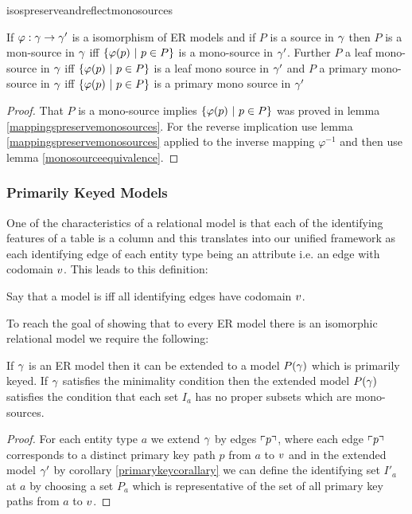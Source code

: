 isospreserveandreflectmonosources
\begin{lemma}
\label{isospreserveandreflectmonosources}
If $\varphi: \gamma \rightarrow \gamma'$ is a isomorphism of ER models and
if $P$ is a source in $\gamma$ then 
$P$ is a mon-source in $\gamma$
iff 
$\left\{\varphi(p) \ \middle|\ p\in P\right\}$ is a mono-source in $\gamma'$. 
Further  $P$ a leaf mono-source in $\gamma$ iff $\left\{\varphi(p) \ \middle|\ p\in P\right\}$ is a leaf mono source in $\gamma'$ and $P$ a primary mono-source in $\gamma$ iff $\left\{\varphi(p) \ \middle|\ p\in P\right\}$ is a primary mono source in $\gamma'$
\end{lemma}
\begin{proof}
That $P$ is a mono-source implies $\left\{\varphi(p) \ \middle|\ p\in P\right\}$ was proved
in lemma \ref{mappingspreservemonosources}. For the reverse implication use 
lemma \ref{mappingspreservemonosources} applied to the inverse mapping $\varphi^{-1}$
and then use lemma \ref{monosourceequivalence}.
\end{proof}


\subsubsection{Primarily Keyed Models}

One of the characteristics of a relational model is that each of the identifying features of a table is a column
and this translates into our unified framework as each identifying edge of each entity type being an attribute i.e. 
an edge with codomain $v$. This leads to this definition: 
\begin{definition}
Say that a model is  iff all identifying edges 
have codomain $v$.
\end{definition}
To reach the goal of showing that to every ER model there is an isomorphic relational model we require the following:
\begin{lemma}
If $\gamma$ is an ER model then it can be extended to a model $P(\gamma)$
which is primarily keyed. If $\gamma$ satisfies the minimality condition then the
extended model $P(\gamma)$ satisfies the  condition that each set $I_a$ has no proper subsets which are mono-sources. 
\end{lemma}
\begin{proof}
For each entity type $a$ we extend $\gamma$ by edges $\left\ulcorner p\right\urcorner$, where each edge 
$\left\ulcorner p\right\urcorner$ corresponds to a distinct primary key path $p$ from $a$ to $v$
and in the extended model $\gamma'$ by corollary \ref{primarykeycorallary} 
we can define the identifying set $I'_a$ at $a$ by choosing a set $P_a$ which is representative of the set of all primary key paths from $a$ to $v$.
\end{proof}

